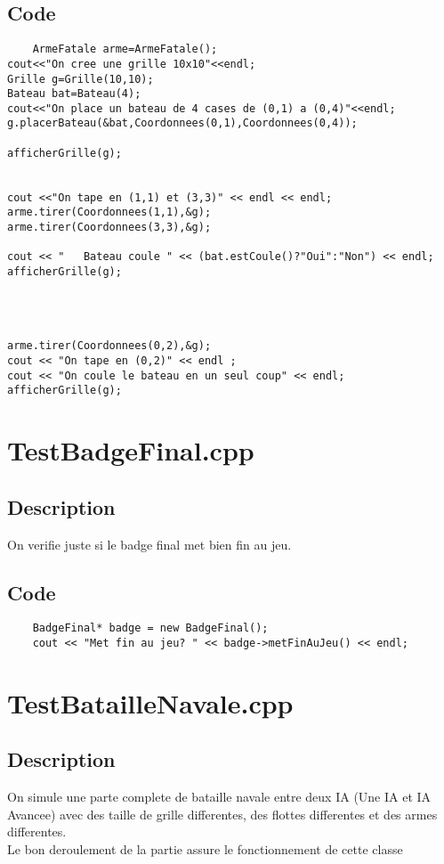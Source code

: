         \subsection{Code}
\begin{lstlisting}
	ArmeFatale arme=ArmeFatale();
cout<<"On cree une grille 10x10"<<endl;
Grille g=Grille(10,10);
Bateau bat=Bateau(4);
cout<<"On place un bateau de 4 cases de (0,1) a (0,4)"<<endl;
g.placerBateau(&bat,Coordonnees(0,1),Coordonnees(0,4));

afficherGrille(g);


cout <<"On tape en (1,1) et (3,3)" << endl << endl;
arme.tirer(Coordonnees(1,1),&g);
arme.tirer(Coordonnees(3,3),&g);

cout << "   Bateau coule " << (bat.estCoule()?"Oui":"Non") << endl;
afficherGrille(g);




arme.tirer(Coordonnees(0,2),&g);
cout << "On tape en (0,2)" << endl ; 
cout << "On coule le bateau en un seul coup" << endl;
afficherGrille(g);
	\end{lstlisting}
    \section{TestBadgeFinal.cpp}
        \subsection{Description}
            On verifie juste si le badge final met bien fin au jeu.
        \subsection{Code}
\begin{lstlisting}
	BadgeFinal* badge = new BadgeFinal();
	cout << "Met fin au jeu? " << badge->metFinAuJeu() << endl;
	\end{lstlisting}
    \section{TestBatailleNavale.cpp}
        \subsection{Description}
            On simule une parte complete de bataille navale entre deux IA (Une IA et IA Avancee) avec des taille de grille differentes, des flottes differentes et des armes differentes.\\
            Le bon deroulement de la partie assure le fonctionnement de cette classe
